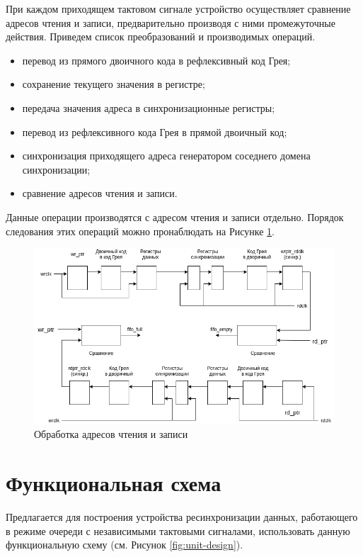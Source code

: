 При каждом приходящем тактовом сигнале устройство осуществляет сравнение адресов чтения и записи, предварительно производя с ними промежуточные действия. Приведем список преобразований и производимых операций.

\begin{itemize}
	\item перевод из прямого двоичного кода в рефлексивный код Грея;
	\item сохранение текущего значения в регистре;
	\item передача значения адреса в синхронизационные регистры;
	\item перевод из рефлексивного кода Грея в прямой двоичный код;
	\item синхронизация приходящего адреса генератором соседнего домена синхронизации;
	\item сравнение адресов чтения и записи.
\end{itemize}

Данные операции производятся с адресом чтения и записи отдельно. Порядок следования этих операций можно пронаблюдать на Рисунке \ref{fig:signal-process}.

\begin{figure}
	\centering
	\includegraphics[width=1\linewidth]{course-scheme/images/signal-process}
	\caption{Обработка адресов чтения и записи}
	\label{fig:signal-process}
\end{figure}



\section{Функциональная схема}
Предлагается для построения устройства ресинхронизации данных, работающего в режиме очереди с независимыми тактовыми сигналами, использовать данную функциональную схему (см. Рисунок \ref{fig:unit-design}).

